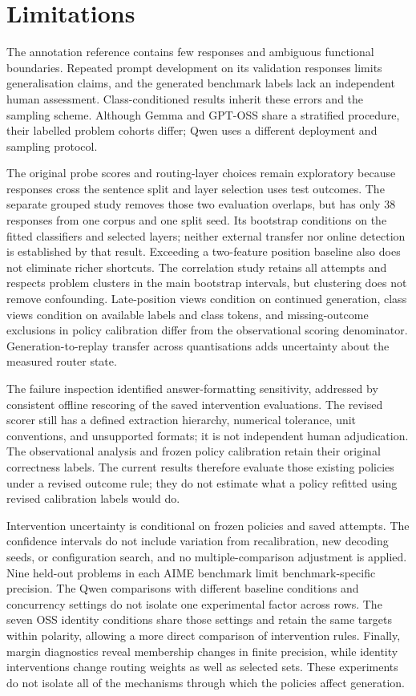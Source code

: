 \documentclass[12pt,a4paper,twoside,openright]{book}
\begin{document}
\section{Limitations}

The annotation reference contains few responses and ambiguous functional
boundaries. Repeated prompt development on its validation responses limits
generalisation claims, and the generated benchmark labels lack an independent
human assessment. Class-conditioned results inherit these errors and the
sampling scheme. Although Gemma and GPT-OSS share a stratified procedure,
their labelled problem cohorts differ; Qwen uses a different deployment and
sampling protocol.

The original probe scores and routing-layer choices remain exploratory
because responses cross the sentence split and layer selection uses test
outcomes. The separate grouped study removes those two evaluation overlaps,
but has only 38 responses from one corpus and one split seed. Its bootstrap
conditions on the fitted classifiers and selected layers; neither external
transfer nor online detection is established by that result. Exceeding a
two-feature position baseline also does not eliminate richer shortcuts.
The correlation study retains
all attempts and respects problem clusters in the main bootstrap intervals,
but clustering does not remove confounding. Late-position views condition
on continued generation, class views condition on available labels and
class tokens, and missing-outcome exclusions in policy calibration differ
from the observational scoring denominator. Generation-to-replay transfer
across quantisations adds uncertainty about the measured router state.

The failure inspection identified answer-formatting sensitivity, addressed
by consistent offline rescoring of the saved intervention evaluations.
The revised scorer still has a defined extraction hierarchy, numerical
tolerance, unit conventions, and unsupported formats; it is not independent
human adjudication. The observational analysis and frozen policy calibration
retain their original correctness labels. The current results therefore
evaluate those existing policies under a revised outcome rule; they do not
estimate what a policy refitted using revised calibration labels would do.

Intervention uncertainty is conditional on frozen policies and saved
attempts. The confidence intervals do not include variation from recalibration,
new decoding seeds, or configuration search, and no multiple-comparison
adjustment is applied. Nine held-out problems in each AIME benchmark limit
benchmark-specific precision. The Qwen comparisons with different baseline conditions and concurrency
settings do not isolate one experimental factor across rows. The seven
OSS identity conditions share those settings and retain the same targets
within polarity, allowing a more direct comparison of intervention rules. Finally, margin diagnostics reveal membership
changes in finite precision, while identity interventions change routing
weights as well as selected sets. These experiments do not isolate all of
the mechanisms through which the policies affect generation.
\end{document}
